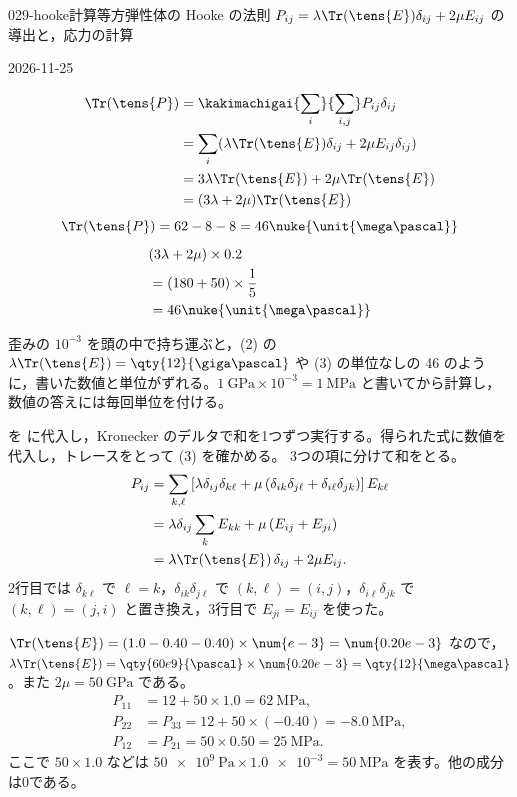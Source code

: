 \documentclass[uplatex,dvipdfmx,a4paper,11pt]{jsarticle}
\begin{document}
\begin{mondai}{029-hooke}{計算}{等方弾性体の Hooke の法則 $P_{ij}=\lambda\Tr(\tens{E})\delta_{ij}+2\mu E_{ij}$ の導出と，応力の計算}
\begin{kotaeutsushi}{2026-11-25}
\begin{align*}
\end{align*}
\begin{align*}
\Tr(\tens{P})&=\kakimachigai{\sum_{i}}{\sum_{i,j}}P_{ij}\delta_{ij}\\
&=\sum_{i}(\lambda\Tr(\tens{E})\delta_{ij}+2\mu E_{ij}\delta_{ij})\\
&=3\lambda\Tr(\tens{E})+2\mu\Tr(\tens{E})\\
&=(3\lambda+2\mu)\Tr(\tens{E})
\end{align*}
\[ \Tr(\tens{P})=62-8-8=46\nuke{\unit{\mega\pascal}} \]
\begin{align*}
&(3\lambda+2\mu)\times0.2\\
&=(180+50)\times\frac{1}{5}\\
&=46\nuke{\unit{\mega\pascal}}
\end{align*}
\end{kotaeutsushi}
\begin{kizuki}
\item 歪みの $10^{-3}$ を頭の中で持ち運ぶと，(2) の $\lambda\Tr(\tens{E})=\qty{12}{\giga\pascal}$ や (3) の単位なしの 46 のように，書いた数値と単位がずれる。$\qty{1}{\giga\pascal}\times10^{-3}=\qty{1}{\mega\pascal}$ と書いてから計算し，数値の答えには毎回単位を付ける。
\end{kizuki}
\begin{tadashii}
\houshin {} を  に代入し，Kronecker のデルタで和を1つずつ実行する。得られた式に数値を代入し，トレースをとって (3) を確かめる。
\keisan {} 3つの項に分けて和をとる。
\begin{align*}
P_{ij}&=\sum_{k,\ell}\left[\lambda\delta_{ij}\delta_{k\ell}+\mu\left(\delta_{ik}\delta_{j\ell}+\delta_{i\ell}\delta_{jk}\right)\right]E_{k\ell}\\
&=\lambda\delta_{ij}\sum_{k}E_{kk}+\mu\left(E_{ij}+E_{ji}\right)\\
&=\lambda\Tr(\tens{E})\,\delta_{ij}+2\mu E_{ij}.
\end{align*}
2行目では $\delta_{k\ell}$ で $\ell=k$，$\delta_{ik}\delta_{j\ell}$ で $(k,\ell)=(i,j)$，$\delta_{i\ell}\delta_{jk}$ で $(k,\ell)=(j,i)$ と置き換え，3行目で $E_{ji}=E_{ij}$ を使った。

 $\Tr(\tens{E})=(1.0-0.40-0.40)\times\num{e-3}=\num{0.20e-3}$ なので，$\lambda\Tr(\tens{E})=\qty{60e9}{\pascal}\times\num{0.20e-3}=\qty{12}{\mega\pascal}$。また $2\mu=\qty{50}{\giga\pascal}$ である。
\begin{align*}
P_{11}&=12+50\times1.0=\qty{62}{\mega\pascal},\\
P_{22}&=P_{33}=12+50\times(-0.40)=\qty{-8.0}{\mega\pascal},\\
P_{12}&=P_{21}=50\times0.50=\qty{25}{\mega\pascal}.
\end{align*}
ここで $50\times1.0$ などは $\qty{50e9}{\pascal}\times\num{1.0e-3}=\qty{50}{\mega\pascal}$ を表す。他の成分は0である。


\end{tadashii}
\end{mondai}
\end{document}
